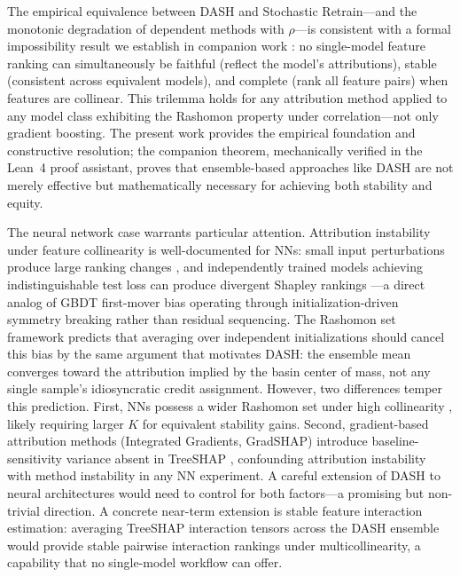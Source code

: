 \documentclass[11pt]{article}
\newcommand{\dash}{\textsc{DASH}}
\newcommand{\rhovar}{\rho}
\begin{document}
The empirical equivalence between \dash{} and Stochastic Retrain---and
the monotonic degradation of dependent methods with
$\rhovar$---is consistent with a formal impossibility result we
establish in companion work \citep{caraker2026impossibility}: no
single-model feature ranking can simultaneously be faithful (reflect
the model's attributions), stable (consistent across equivalent models),
and complete (rank all feature pairs) when features are collinear.
This trilemma holds for any attribution method applied to any model
class exhibiting the Rashomon property under correlation---not only
gradient boosting. The present work provides the empirical foundation
and constructive resolution; the companion theorem, mechanically
verified in the Lean~4 proof assistant, proves that ensemble-based
approaches like \dash{} are not merely effective but mathematically
necessary for achieving both stability and equity.

The neural network case warrants particular attention. Attribution
instability under feature collinearity is well-documented for NNs:
small input perturbations produce large ranking changes
\citep{ghorbani2019interpretation}, and independently trained models
achieving indistinguishable test loss can produce divergent Shapley
rankings \citep{damour2020underspecification}---a direct analog of
GBDT first-mover bias operating through initialization-driven symmetry
breaking rather than residual sequencing. The Rashomon set framework
\citep{fisher2019all, semenova2022existence} predicts that averaging
over independent initializations should cancel this bias by the same
argument that motivates \dash{}: the ensemble mean converges toward
the attribution implied by the basin center of mass, not any single
sample's idiosyncratic credit assignment. However, two differences
temper this prediction. First, NNs possess a wider Rashomon set under
high collinearity \citep{damour2020underspecification}, likely
requiring larger $K$ for equivalent stability gains. Second,
gradient-based attribution methods (Integrated Gradients, GradSHAP)
introduce baseline-sensitivity variance absent in TreeSHAP
\citep{alvarez2018towards}, confounding attribution instability with
method instability in any NN experiment. A careful extension of \dash{}
to neural architectures would need to control for both factors---a
promising but non-trivial direction. A concrete near-term extension
is stable feature interaction estimation: averaging TreeSHAP interaction
tensors across the \dash{} ensemble would provide stable pairwise
interaction rankings under multicollinearity, a capability that no
single-model workflow can offer.
\end{document}
